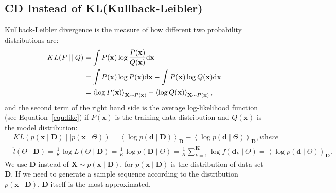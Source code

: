\subsection{CD Instead of KL(Kullback-Leibler)}
\label{sec:CD}
	Kullback-Leibler divergence is the measure of how different two probability distributions are:
	\begin{equation}
	\begin{aligned}
	KL(P \mid \mid Q)
	&= \int P(\mathbf{x}) \log \frac{P(\mathbf{x})}{Q(\mathbf{x})} \mathrm{d} \mathbf{x}\\
	&= \int P(\mathbf{x}) \log P(\mathbf{x}) \mathrm{d} \mathbf{x} - \int P(\mathbf{x}) \log Q(\mathbf{x}) \mathrm{d} \mathbf{x}\\
	&= \left \langle \log P(\mathbf{x}) \right \rangle_{\mathbf{X} \sim P(\mathbf{x})} - \left \langle \log Q(\mathbf{x}) \right \rangle_{\mathbf{X} \sim P(\mathbf{x})} ,
	\end{aligned}
	\end{equation}
	and the second term of the right hand side is the average log-likelihood function (see Equation~\ref{equ:like}) if $P(\mathbf{x})$ is the training data distribution and $Q(\mathbf{x})$ is the model distribution:
	\begin{equation}
	\begin{aligned}
	& KL \left( p(\mathbf{x} \mid \mathbf{D}) \mid \mid p(\mathbf{x} \mid \Theta) \right)
	=   \left \langle \log p(\mathbf{d} \mid \mathbf{D}) \right \rangle_{\mathbf{D}} - \left \langle \log p(\mathbf{d} \mid \Theta) \right \rangle_{\mathbf{D}}, \textit{where} \\
	& \hat{l} (\Theta \mid \mathbf{D}) =\frac{1}{K}\log  L (\Theta \mid \mathbf{D}) 
	=  \frac{1}{K}\log p(\mathbf{D} \mid \Theta ) 
	= \frac{1}{K} \sum_{k=1}^{\mathbf{K}} \log f(\mathbf{d}_k \mid \Theta )
	= \left \langle \log p(\mathbf{d} \mid \Theta) \right \rangle_{\mathbf{D}}.
	\end{aligned}
	\end{equation}
	We use $ \mathbf{D} $ instead of $ \mathbf{X} \sim p(\mathbf{x} \mid \mathbf{D}) $, for $ p(\mathbf{x} \mid \mathbf{D}) $ is the distribution of data set $ \mathbf{D} $.
	If we need to generate a sample sequence according to the distribution $ p(\mathbf{x} \mid \mathbf{D}) $, $ \mathbf{D} $ itself is the most approximated.
